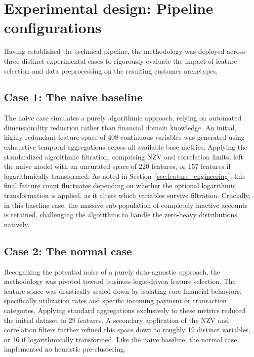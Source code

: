     \section{Experimental design: Pipeline configurations}
    \label{sec:experimental_design}
    Having established the technical pipeline, the methodology was deployed across three distinct experimental cases to rigorously evaluate the impact of feature selection and data preprocessing on the resulting customer archetypes.
    
        \subsection{Case 1: The naive baseline}
        The naive case simulates a purely algorithmic approach, relying on automated dimensionality reduction rather than financial domain knowledge.
        An initial, highly redundant feature space of 408 continuous variables was generated using exhaustive temporal aggregations across all available base metrics.
        Applying the standardized algorithmic filtration, comprising NZV and correlation limits, left the naive model with an uncurated space of 220 features, or 157 features if logarithmically transformed.
        As noted in Section~\ref{sec:feature_engineering}, this final feature count fluctuates depending on whether the optional logarithmic transformation is applied, as it alters which variables survive filtration.
        Crucially, in this baseline case, the massive sub-population of completely inactive accounts is retained, challenging the algorithms to handle the zero-heavy distributions natively.
        
        \subsection{Case 2: The normal case}
        Recognizing the potential noise of a purely data-agnostic approach, the methodology was pivoted toward business-logic-driven feature selection.
        The feature space was drastically scaled down by isolating core financial behaviors, specifically utilization rates and specific incoming payment or transaction categories.
        Applying standard aggregations exclusively to these metrics reduced the initial dataset to 29 features.
        A secondary application of the NZV and correlation filters further refined this space down to roughly 19 distinct variables, or 16 if logarithmically transformed.
        Like the naive baseline, the normal case implemented no heuristic pre-clustering.
        
